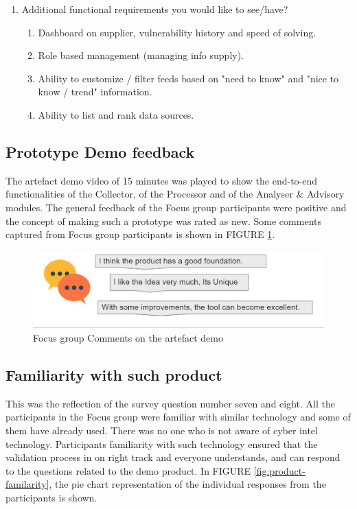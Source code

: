 \begin{enumerate}
\begin{enumerate}
\end{enumerate}
    \item Additional functional requirements you would like to see/have?
    \begin{enumerate}
        \item Dashboard on supplier, vulnerability history and speed of solving.
        \item Role based management (managing info supply).
        \item Ability to customize / filter feeds based on "need to know" and "nice to know / trend" information.
        \item Ability to list and rank data sources.
    \end{enumerate}
\end{enumerate}


\subsection{Prototype Demo feedback}
 The artefact demo video of 15 minutes was played to show the end-to-end functionalities of the Collector, of the Processor and of the Analyser \& Advisory modules. 
The general feedback of the Focus group participants were positive and the concept of making such a prototype was rated as new. 
Some comments captured from Focus group participants is shown in FIGURE \ref{fig:feedback}.

\begin{figure}[ht]
    \centering
    \includegraphics[width=.65\linewidth]{Figures/feedback.png}
    \caption{Focus group Comments on the artefact demo}
    \label{fig:feedback}
\end{figure}
 \FloatBarrier

\subsection{Familiarity with such product}
\label{ref:familiar}
This was the reflection of the survey question number seven and eight. All the participants in the Focus group were familiar with similar technology and some of them have already used. 
There was no one who is not aware of cyber intel technology. 
Participants familiarity with such technology ensured that the validation process in on right track and everyone understands, and can respond to the questions related to the demo product. In FIGURE \ref{fig:product-familarity}, the pie chart representation of the individual responses from the participants is shown.

